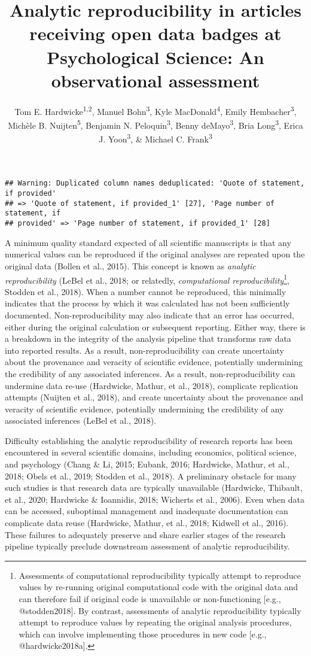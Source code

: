 \documentclass[english,,man,floatsintext]{apa6}
\author{Tom E. Hardwicke\textsuperscript{1,2}, Manuel Bohn\textsuperscript{3}, Kyle MacDonald\textsuperscript{4}, Emily Hembacher\textsuperscript{3}, Michèle B. Nuijten\textsuperscript{5}, Benjamin N. Peloquin\textsuperscript{3}, Benny deMayo\textsuperscript{3}, Bria Long\textsuperscript{3}, Erica J. Yoon\textsuperscript{3}, \& Michael C. Frank\textsuperscript{3}}
\affiliation{
\vspace{0.5cm}
\textsuperscript{1} University of Amsterdam\\\textsuperscript{2} Charité – Universitätsmedizin Berlin\\\textsuperscript{3} Stanford University\\\textsuperscript{4} University of California, Los Angeles\\\textsuperscript{5} Tilburg University}
\title{Analytic reproducibility in articles receiving open data badges at Psychological Science: An observational assessment}
\date{}
\begin{document}
\maketitle

\begin{verbatim}
## Warning: Duplicated column names deduplicated: 'Quote of statement, if provided'
## => 'Quote of statement, if provided_1' [27], 'Page number of statement, if
## provided' => 'Page number of statement, if provided_1' [28]
\end{verbatim}

A minimum quality standard expected of all scientific manuscripts is that any numerical values can be reproduced if the original analyses are repeated upon the original data (Bollen et al., 2015). This concept is known as \emph{analytic reproducibility} (LeBel et al., 2018; or relatedly, \emph{computational reproducibility}\footnote{Assessments of computational reproducibility typically attempt to reproduce values by re-running original computational code with the original data and can therefore fail if original code is unavailable or non-functioning {[}e.g., @stodden2018{]}. By contrast, assessments of analytic reproducibility typically attempt to reproduce values by repeating the original analysis procedures, which can involve implementing those procedures in new code {[}e.g., @hardwicke2018a{]}.}, Stodden et al., 2018). When a number cannot be reproduced, this minimally indicates that the process by which it was calculated has not been sufficiently documented. Non-reproducibility may also indicate that an error has occurred, either during the original calculation or subsequent reporting. Either way, there is a breakdown in the integrity of the analysis pipeline that transforms raw data into reported results. As a result, non-reproducibility can create uncertainty about the provenance and veracity of scientific evidence, potentially undermining the credibility of any associated inferences. As a result, non-reproducibility can undermine data re-use (Hardwicke, Mathur, et al., 2018), complicate replication attempts (Nuijten et al., 2018), and create uncertainty about the provenance and veracity of scientific evidence, potentially undermining the credibility of any associated inferences (LeBel et al., 2018).

Difficulty establishing the analytic reproducibility of research reports has been encountered in several scientific domains, including economics, political science, and psychology (Chang \& Li, 2015; Eubank, 2016; Hardwicke, Mathur, et al., 2018; Obels et al., 2019; Stodden et al., 2018). A preliminary obstacle for many such studies is that research data are typically unavailable (Hardwicke, Thibault, et al., 2020; Hardwicke \& Ioannidis, 2018; Wicherts et al., 2006). Even when data can be accessed, suboptimal management and inadequate documentation can complicate data reuse (Hardwicke, Mathur, et al., 2018; Kidwell et al., 2016). These failures to adequately preserve and share earlier stages of the research pipeline typically preclude downstream assessment of analytic reproducibility.
\end{document}
